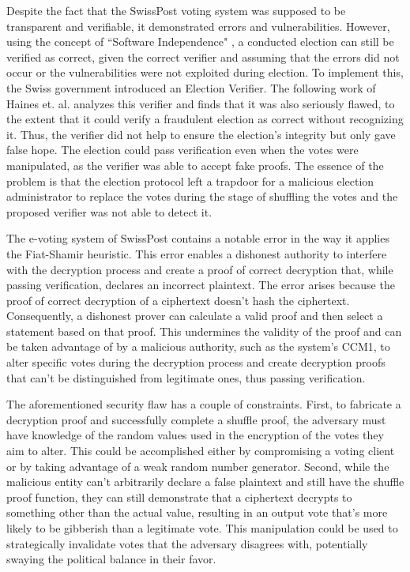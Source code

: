 Despite the fact that the SwissPost voting system was supposed to be transparent and verifiable, it demonstrated errors and vulnerabilities. However, using the concept of ``Software Independence" \cite{Rivest2008OnTN}, a conducted election can still be verified as correct, given the correct verifier and assuming that the errors did not occur or the vulnerabilities were not exploited during election. To implement this, the Swiss government introduced an Election Verifier. The following work of Haines et. al. \cite{Haines2020HowNT} analyzes this verifier and finds that it was also seriously flawed, to the extent that it could verify a fraudulent election as correct without recognizing it. Thus, the verifier did not help to ensure the election's integrity but only gave false hope. The election could pass verification even when the votes were manipulated, as the verifier was able to accept fake proofs. The essence of the problem is that the election protocol left a trapdoor for a malicious election administrator to replace the votes during the stage of shuffling the votes \cite{Haines2022RunningTR} and the proposed verifier was not able to detect it.

The e-voting system of SwissPost contains a notable error in the way it applies the Fiat-Shamir heuristic. This error enables a dishonest authority to interfere with the decryption process and create a proof of correct decryption that, while passing verification, declares an incorrect plaintext. The error arises because the proof of correct decryption of a ciphertext doesn't hash the ciphertext. Consequently, a dishonest prover can calculate a valid proof and then select a statement based on that proof. This undermines the validity of the proof and can be taken advantage of by a malicious authority, such as the system's CCM1, to alter specific votes during the decryption process and create decryption proofs that can't be distinguished from legitimate ones, thus passing verification.

The aforementioned security flaw has a couple of constraints. First, to fabricate a decryption proof and successfully complete a shuffle proof, the adversary must have knowledge of the random values used in the encryption of the votes they aim to alter. This could be accomplished either by compromising a voting client or by taking advantage of a weak random number generator. Second, while the malicious entity can't arbitrarily declare a false plaintext and still have the shuffle proof function, they can still demonstrate that a ciphertext decrypts to something other than the actual value, resulting in an output vote that's more likely to be gibberish than a legitimate vote. This manipulation could be used to strategically invalidate votes that the adversary disagrees with, potentially swaying the political balance in their favor.

